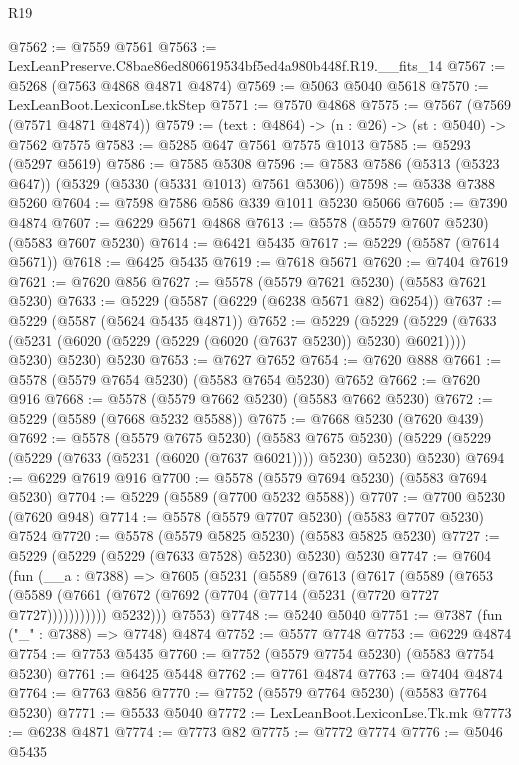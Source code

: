 \begin{lexlean}{R19}
\begin{coremodule}
@7562 := @7559 @7561
@7563 := LexLeanPreserve.C8bae86ed806619534bf5ed4a980b448f.R19.__fits_14
@7567 := @5268 (@7563 @4868 @4871 @4874)
@7569 := @5063 @5040 @5618
@7570 := LexLeanBoot.LexiconLse.tkStep
@7571 := @7570 @4868
@7575 := @7567 (@7569 (@7571 @4871 @4874))
@7579 := (text : @4864) -> (n : @26) -> (st : @5040) -> @7562 @7575
@7583 := @5285 @647 @7561 @7575 @1013
@7585 := @5293 (@5297 @5619)
@7586 := @7585 @5308
@7596 := @7583 @7586 (@5313 (@5323 @647)) (@5329 (@5330 (@5331 @1013) @7561 @5306))
@7598 := @5338 @7388 @5260
@7604 := @7598 @7586 @586 @339 @1011 @5230 @5066
@7605 := @7390 @4874
@7607 := @6229 @5671 @4868
@7613 := @5578 (@5579 @7607 @5230) (@5583 @7607 @5230)
@7614 := @6421 @5435
@7617 := @5229 (@5587 (@7614 @5671))
@7618 := @6425 @5435
@7619 := @7618 @5671
@7620 := @7404 @7619
@7621 := @7620 @856
@7627 := @5578 (@5579 @7621 @5230) (@5583 @7621 @5230)
@7633 := @5229 (@5587 (@6229 (@6238 @5671 @82) @6254))
@7637 := @5229 (@5587 (@5624 @5435 @4871))
@7652 := @5229
    (@5229
      (@5229 (@7633 (@5231 (@6020 (@5229 (@5229 (@6020 (@7637 @5230)) @5230) @6021)))) @5230)
      @5230)
    @5230
@7653 := @7627 @7652
@7654 := @7620 @888
@7661 := @5578 (@5579 @7654 @5230) (@5583 @7654 @5230) @7652
@7662 := @7620 @916
@7668 := @5578 (@5579 @7662 @5230) (@5583 @7662 @5230)
@7672 := @5229 (@5589 (@7668 @5232 @5588))
@7675 := @7668 @5230 (@7620 @439)
@7692 := @5578
    (@5579 @7675 @5230)
    (@5583 @7675 @5230)
    (@5229 (@5229 (@5229 (@7633 (@5231 (@6020 (@7637 @6021)))) @5230) @5230) @5230)
@7694 := @6229 @7619 @916
@7700 := @5578 (@5579 @7694 @5230) (@5583 @7694 @5230)
@7704 := @5229 (@5589 (@7700 @5232 @5588))
@7707 := @7700 @5230 (@7620 @948)
@7714 := @5578 (@5579 @7707 @5230) (@5583 @7707 @5230) @7524
@7720 := @5578 (@5579 @5825 @5230) (@5583 @5825 @5230)
@7727 := @5229 (@5229 (@5229 (@7633 @7528) @5230) @5230) @5230
@7747 := @7604
    (fun (__a : @7388) =>
    @7605
      (@5231
        (@5589
          (@7613
            (@7617
              (@5589
                (@7653
                  (@5589 (@7661 (@7672 (@7692 (@7704 (@7714 (@5231 (@7720 @7727 @7727)))))))))))
            @5232)))
      @7553)
@7748 := @5240 @5040
@7751 := @7387 (fun ("_" : @7388) => @7748) @4874
@7752 := @5577 @7748
@7753 := @6229 @4874
@7754 := @7753 @5435
@7760 := @7752 (@5579 @7754 @5230) (@5583 @7754 @5230)
@7761 := @6425 @5448
@7762 := @7761 @4874
@7763 := @7404 @4874
@7764 := @7763 @856
@7770 := @7752 (@5579 @7764 @5230) (@5583 @7764 @5230)
@7771 := @5533 @5040
@7772 := LexLeanBoot.LexiconLse.Tk.mk
@7773 := @6238 @4871
@7774 := @7773 @82
@7775 := @7772 @7774
@7776 := @5046 @5435

\end{coremodule}
\end{lexlean}
